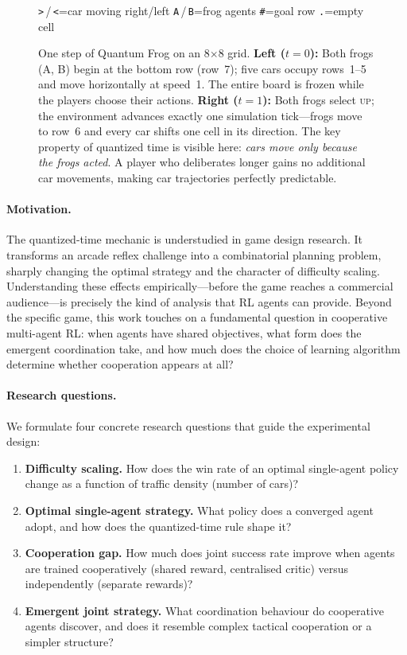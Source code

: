 \documentclass[12pt]{article}
\begin{document}
\begin{figure}[t]
\vspace{8pt}
{\small
  \texttt{>}\,/\,\texttt{<}\;=\;car moving right/left\quad
  \texttt{A}\,/\,\texttt{B}\;=\;frog agents\quad
  \texttt{\#}\;=\;goal row\quad
  \texttt{.}\;=\;empty cell
}
\caption{%
  One step of Quantum Frog on an 8$\times$8 grid.
  \textbf{Left ($t=0$):} Both frogs (A, B) begin at the bottom row (row~7);
  five cars occupy rows~1--5 and move horizontally at speed~1.
  The entire board is frozen while the players choose their actions.
  \textbf{Right ($t=1$):} Both frogs select \textsc{up}; the environment
  advances exactly one simulation tick—frogs move to row~6 and every car
  shifts one cell in its direction.
  The key property of quantized time is visible here: \emph{cars move only
  because the frogs acted}.  A player who deliberates longer gains no
  additional car movements, making car trajectories perfectly predictable.%
}
\label{fig:game}
\end{figure}

\paragraph{Motivation.}
The quantized-time mechanic is understudied in game design research.  It
transforms an arcade reflex challenge into a combinatorial planning problem,
sharply changing the optimal strategy and the character of difficulty scaling.
Understanding these effects empirically—before the game reaches a commercial
audience—is precisely the kind of analysis that RL agents can provide.
Beyond the specific game, this work touches on a fundamental question in
cooperative multi-agent RL: when agents have shared objectives, what form
does the emergent coordination take, and how much does the choice of
learning algorithm determine whether cooperation appears at all?

\paragraph{Research questions.}
We formulate four concrete research questions that guide the experimental
design:
\begin{enumerate}[label=\textbf{RQ\arabic*.}]
  \item \textbf{Difficulty scaling.} How does the win rate of an optimal
        single-agent policy change as a function of traffic density (number
        of cars)?
  \item \textbf{Optimal single-agent strategy.} What policy does a
        converged agent adopt, and how does the quantized-time rule shape it?
  \item \textbf{Cooperation gap.} How much does joint success rate improve
        when agents are trained cooperatively (shared reward, centralised
        critic) versus independently (separate rewards)?
  \item \textbf{Emergent joint strategy.} What coordination behaviour do
        cooperative agents discover, and does it resemble complex tactical
        cooperation or a simpler structure?
\end{enumerate}
\end{document}
